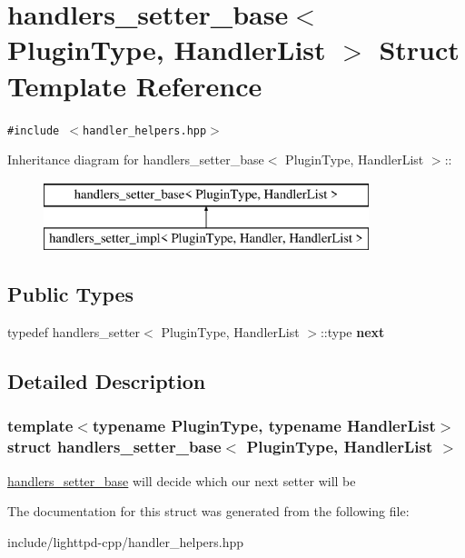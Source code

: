 \hypertarget{structhandlers__setter__base}{
\section{handlers\_\-setter\_\-base$<$ PluginType, HandlerList $>$ Struct Template Reference}
\label{structhandlers__setter__base}
}
{\tt \#include $<$handler\_\-helpers.hpp$>$}

Inheritance diagram for handlers\_\-setter\_\-base$<$ PluginType, HandlerList $>$::\begin{figure}[H]
\begin{center}
\leavevmode
\includegraphics[height=2cm]{structhandlers__setter__base}
\end{center}
\end{figure}
\subsection*{Public Types}
\begin{CompactItemize}
\item 
\hypertarget{structhandlers__setter__base_50f6159e54d3b169f2f0ce5f80d865b4}{
typedef handlers\_\-setter$<$ PluginType, HandlerList $>$::type \textbf{next}}
\label{structhandlers__setter__base_50f6159e54d3b169f2f0ce5f80d865b4}

\end{CompactItemize}


\subsection{Detailed Description}
\subsubsection*{template$<$typename PluginType, typename HandlerList$>$ struct handlers\_\-setter\_\-base$<$ PluginType, HandlerList $>$}

\hyperlink{structhandlers__setter__base}{handlers\_\-setter\_\-base} will decide which our next setter will be 

The documentation for this struct was generated from the following file:\begin{CompactItemize}
\item 
include/lighttpd-cpp/handler\_\-helpers.hpp\end{CompactItemize}
